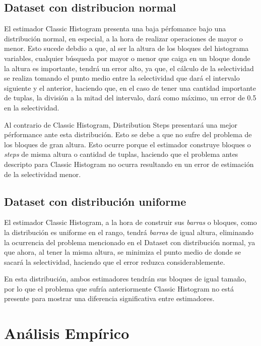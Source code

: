 \documentclass[a4paper, 10pt, twoside]{article}
\begin{document}
\subsection{Dataset con distribucion normal}
El estimador Classic Histogram presenta una baja pérfomance bajo una distribución normal, en especial, a la hora de realizar operaciones de mayor o menor.
Esto sucede debdio a que, al ser la altura de los bloques del histograma variables, cualquier búsqueda por mayor o menor que caiga en un bloque
donde la altura es importante, tendrá un error alto, ya que, el cálculo de la selectividad se realiza tomando el punto medio entre la selectividad que dará
el intervalo siguiente y el anterior, haciendo que, en el caso de tener una cantidad importante de tuplas, la división a la mitad del intervalo, dará como máximo,
un error de 0.5 en la selectividad.

Al contrario de Classic Histogram, Distribution Steps presentará una mejor pérformance ante esta distribución. Esto se debe a que no sufre del problema
de los bloques de gran altura. Esto ocurre porque el estimador construye bloques o \textit{steps} de misma altura o cantidad de tuplas, haciendo que el problema 
antes descripto para Classic Histogram no ocurra resultando en un error de estimación de la selectividad menor.

\subsection{Dataset con distribución uniforme}
El estimador Classic Histogram, a la hora de construir sus \textit{barras} o bloques, como la distribución es uniforme en el rango, tendrá \textit{barras}
de igual altura, eliminando la ocurrencia del problema mencionado en el Dataset con distribución normal, ya que ahora, al tener la misma altura, se minimiza
el punto medio de donde se sacará la selectividad, haciendo que el error reduzca considerablemente.

En esta distribución, ambos estimadores tendrán sus bloques de igual tamaño, por lo que el problema que sufría anteriormente Classic Histogram no está
presente para mostrar una diferencia significativa entre estimadores.




\section{Análisis Empírico}
\end{document}
